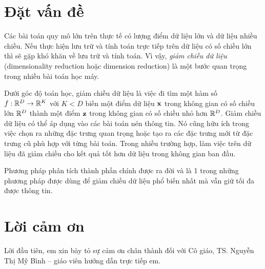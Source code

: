 

\section{Đặt vấn đề}

Các bài toán quy mô lớn trên thực tế có lượng điểm dữ liệu lớn và dữ liệu nhiều
chiều. Nếu thực hiện lưu trữ và tính toán trực tiếp trên dữ liệu có số chiều lớn
thì sẽ gặp khó khăn về lưu trữ và tính toán. Vì vậy, \textit{giảm
    chiều dữ liệu} ({dimensionality reduction} hoặc {dimension reduction}) là một
bước quan trọng trong nhiều bài toán học máy.


Dưới góc độ toán học, giảm chiều dữ liệu là việc đi tìm một hàm số $f: \mathbb{R}^D
    \rightarrow \mathbb{R}^K$ với $K < D$ biến một điểm dữ liệu $\mathbf{x}$ trong không gian có số
chiều lớn $\mathbb{R}^D$ thành một điểm $\mathbf{z}$ trong không gian có số chiều nhỏ hơn
$\mathbb{R}^D$. Giảm chiều dữ liệu có thể áp dụng vào các bài toán nén thông tin. Nó cũng hữu ích trong việc chọn ra những đặc trưng quan trọng hoặc
tạo ra các đặc trưng mới từ đặc trưng cũ phù hợp với từng bài toán. Trong nhiều trường hợp, làm việc trên dữ liệu đã giảm chiều cho kết quả tốt
hơn dữ liệu trong không gian ban đầu.

Phương pháp phân tích thành phần chính được ra đời và là 1 trong những phương pháp được dùng để giảm chiều dữ liệu phổ biến nhất
mà vẫn giữ tối đa được thông tin.


\newpage 
\section{Lời cảm ơn}

Lời đầu tiên, em xin bày tỏ sự cảm ơn chân thành đối với Cô giáo, TS.
Nguyễn Thị Mỹ Bình – giáo viên hướng dẫn trực tiếp em.

